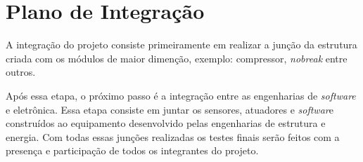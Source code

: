 \chapter[Plano de Integração]{Plano de Integração}
A integração do projeto consiste primeiramente em realizar a junção da estrutura
 criada com os módulos de maior dimenção, exemplo: compressor, \textit{nobreak}
 entre outros.

Após essa etapa, o próximo passo é a integração entre as
 engenharias de \textit{software} e eletrônica. Essa 
 etapa consiste em juntar os sensores, atuadores e \textit{softwar}e construídos ao
 equipamento desenvolvido pelas engenharias de  estrutura e energia.
 Com todas essas junções realizadas os testes finais serão feitos com
 a presença e participação de todos os integrantes do projeto.
